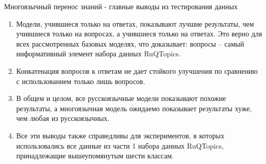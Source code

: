 \begin{frame}{Многоязычный перенос знаний - главные выводы из тестирования данных}
\begin{enumerate}
\item Модели, учившиеся только на ответах, показывают лучшие результаты, чем учившиеся только на вопросах, а учившиеся только на ответах. Это верно для всех рассмотренных базовых моделях, что доказывает: вопросы -- самый информативный элемент набора данных {RuQTopics}. 

\item Конкатенация вопросов к ответам не дает стойкого улучшения по сравнению с использованием только лишь вопросов. 

\item В общем и целом, все русскоязычные модели показывают похожие результаты, а многоязычная модель ожидаемо показывает результаты хуже, чем любая из русскоязычных. 

\item Все эти выводы также справедливы для экспериментов, в которых использовались все данные из части 1 набора данных {RuQTopics}, принадлежащие вышеупомянутым шести классам.
\end{enumerate}
\end{frame}


